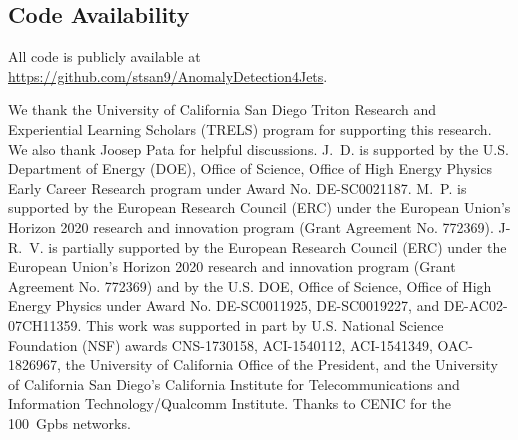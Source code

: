 \documentclass[letterpaper,11pt]{article}
\begin{document}
\subsection{Code Availability}
\label{code:code}

All code is publicly available at \url{https://github.com/stsan9/AnomalyDetection4Jets}.

\acknowledgments

We thank the University of California San Diego Triton Research and Experiential
Learning Scholars (TRELS) program for supporting this research.
We also thank Joosep Pata for helpful discussions.
J.~D. is supported by the U.S. Department of Energy (DOE), Office of Science, Office of High Energy Physics Early Career Research program under Award No. DE-SC0021187.
M.~P. is supported by the European Research Council (ERC) under the European Union's Horizon 2020 research and innovation program (Grant Agreement No. 772369).
J-R.~V. is partially supported by the European Research Council (ERC) under the European Union's Horizon 2020 research and innovation program (Grant Agreement No. 772369) and by the U.S. DOE, Office of Science, Office of High Energy Physics under Award No. DE-SC0011925, DE-SC0019227, and DE-AC02-07CH11359.
This work was supported in part by U.S. National Science Foundation (NSF) awards CNS-1730158, ACI-1540112, ACI-1541349, OAC-1826967, the University of California Office of the President, and the University of California San Diego's California Institute for Telecommunications and Information Technology/Qualcomm Institute. 
Thanks to CENIC for the 100~Gpbs networks.

\vspace{10mm}




\end{document}
